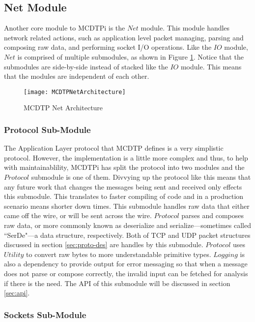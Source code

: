 \subsection{Net Module}\label{sec:net}

Another core module to MCDTPi is the $Net$ module. This module handles network related actions, such as application level packet managing, parsing and composing raw data, and performing socket I/O operations. Like the $IO$ module, $Net$ is comprised of multiple submodules, as shown in Figure \ref{fig:mcdtp-net-arch}. Notice that the submodules are side-by-side instead of stacked like the $IO$ module. This means that the modules are independent of each other.

\begin{figure}[ht]
\centering
\texttt{[image: MCDTPNetArchitecture]}
\caption{MCDTP Net Architecture}
\label{fig:mcdtp-net-arch}
\end{figure}

\subsubsection{Protocol Sub-Module}

The Application Layer protocol that MCDTP defines is a very simplistic protocol. However, the implementation is a little more complex and thus, to help with maintainablility, MCDTPi has split the protocol into two modules and the $Protocol$ submodule is one of them. Divvying up the protocol like this means that any future work that changes the messages being sent and received only effects this submodule. This translates to faster compiling of code and in a production scenario means shorter down times. This submodule handles raw data that either came off the wire, or will be sent across the wire. $Protocol$ parses and composes raw data, or more commonly known as deserialize and serialize---sometimes called ``SerDe"---a data structure, respectively. Both of TCP and UDP packet structures discussed in section \ref{sec:proto-des} are handles by this submodule. $Protocol$ uses $Utility$ to convert raw bytes to more understandable primitive types. $Logging$ is also a dependency to provide output for error messaging so that when a message does not parse or compose correctly, the invalid input can be fetched for analysis if there is the need. The API of this submodule will be discussed in section \ref{sec:api}.

\subsubsection{Sockets Sub-Module}


